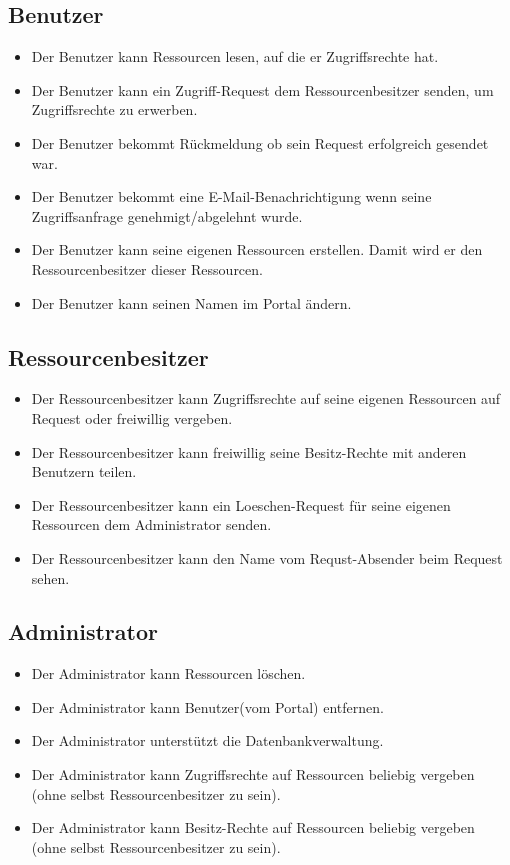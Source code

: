 \documentclass[parskip=full,11pt]{scrartcl}
\begin{document}
\subsection*{Benutzer}
\begin{itemize}[itemsep=0pt]
\item Der Benutzer kann Ressourcen lesen, auf die er \gls{Zugriffsrechte} hat.
\item Der Benutzer kann ein Zugriff-Request dem Ressourcenbesitzer senden, um Zugriffsrechte zu erwerben.
\item Der Benutzer bekommt Rückmeldung ob sein Request erfolgreich gesendet war.
\item Der Benutzer bekommt eine E-Mail-Benachrichtigung wenn seine Zugriffsanfrage genehmigt/abgelehnt wurde.
\item Der Benutzer kann seine eigenen Ressourcen erstellen. Damit wird er den Ressourcenbesitzer dieser Ressourcen.
\item Der Benutzer kann seinen Namen im Portal ändern.
\end{itemize}
 
\subsection*{Ressourcenbesitzer}
\begin{itemize}[itemsep=0pt]

\item Der Ressourcenbesitzer kann Zugriffsrechte auf seine eigenen Ressourcen auf Request oder freiwillig vergeben.
\item Der Ressourcenbesitzer kann freiwillig seine \gls{Besitz-Rechte} mit anderen Benutzern teilen.
\item Der Ressourcenbesitzer kann ein \gls{Loeschen-Request} für seine eigenen Ressourcen dem Administrator senden.
\item Der Ressourcenbesitzer kann den Name vom Requst-Absender beim Request sehen.

\end{itemize}

\subsection*{Administrator}
\begin{itemize}[itemsep=0pt]
\item Der Administrator kann Ressourcen löschen.
\item Der Administrator kann Benutzer(vom Portal) entfernen.
\item Der Administrator unterstützt die Datenbankverwaltung.
\item Der Administrator kann Zugriffsrechte auf Ressourcen beliebig vergeben (ohne selbst Ressourcenbesitzer zu sein).
\item Der Administrator kann Besitz-Rechte auf Ressourcen beliebig vergeben (ohne selbst Ressourcenbesitzer zu sein). 

\end{itemize}
\end{document}
